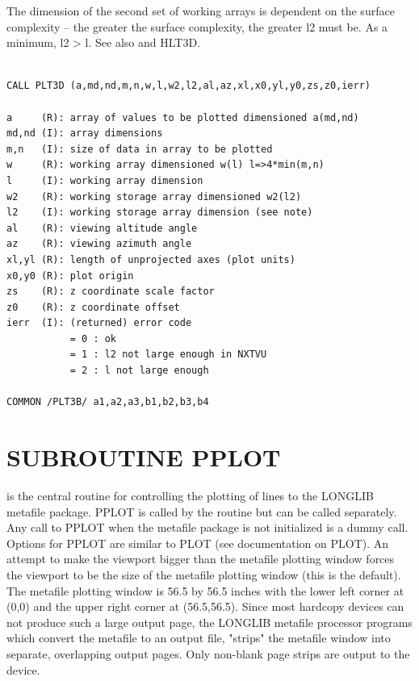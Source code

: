 \documentclass[11pt]{report}
\begin{document}
The dimension of the second set of working arrays is dependent on the
surface complexity -- the greater the surface complexity, the greater
l2 must be.  As a minimum, l2 > l.  See also  and HLT3D.
\begin{verbatim}

CALL PLT3D (a,md,nd,m,n,w,l,w2,l2,al,az,xl,x0,yl,y0,zs,z0,ierr)

a     (R): array of values to be plotted dimensioned a(md,nd)
md,nd (I): array dimensions
m,n   (I): size of data in array to be plotted
w     (R): working array dimensioned w(l) l=>4*min(m,n)
l     (I): working array dimension
w2    (R): working storage array dimensioned w2(l2)
l2    (I): working storage array dimension (see note)
al    (R): viewing altitude angle
az    (R): viewing azimuth angle
xl,yl (R): length of unprojected axes (plot units)
x0,y0 (R): plot origin
zs    (R): z coordinate scale factor
z0    (R): z coordinate offset
ierr  (I): (returned) error code
           = 0 : ok
           = 1 : l2 not large enough in NXTVU
           = 2 : l not large enough

COMMON /PLT3B/ a1,a2,a3,b1,b2,b3,b4
\end{verbatim}

\section{SUBROUTINE PPLOT}

 is the central routine for controlling the plotting of lines to
the LONGLIB metafile package.  PPLOT is called by the  routine
but can be called separately.  Any call to PPLOT when the metafile
package is not initialized is a dummy call.  Options for PPLOT are
similar to PLOT (see documentation on PLOT).  An attempt to make the
viewport bigger than the metafile plotting window forces the
viewport to be the size of the metafile plotting window (this is the
default).  The metafile plotting window is 56.5 by 56.5 inches with
the lower left corner at (0,0) and the upper right corner at
(56.5,56.5).  Since most hardcopy devices can not produce such a large
output page, the LONGLIB metafile processor programs which convert the
metafile to an output file, "strips" the metafile window into
separate, overlapping output pages.  Only non-blank page strips are
output to the device.
\end{document}
